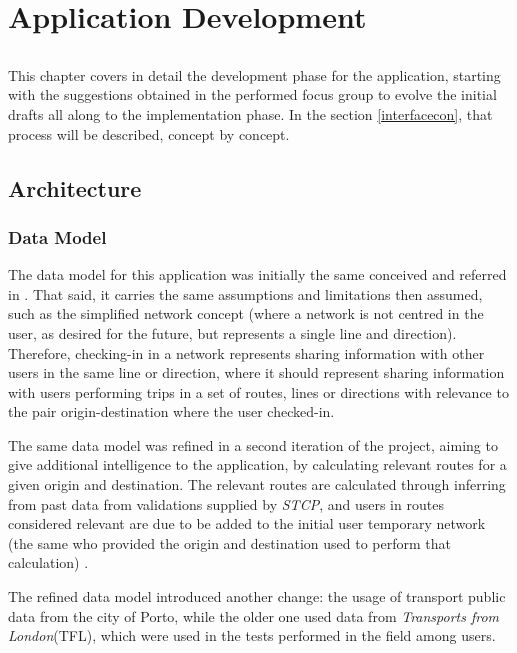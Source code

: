 \chapter{Application Development} \label{chap:chap5}

\section*{}

This chapter covers in detail the development phase for the application, starting with the suggestions obtained in the performed focus group to evolve the initial drafts all along to the implementation phase. In the section \ref{interfacecon}, that process will be described, concept by concept.

\section{Architecture}

\subsection{Data Model}

The data model for this application was initially the same conceived and referred in \cite{kn:Gonc12}. That said, it carries the same assumptions and limitations then assumed, such as the simplified network concept (where a network is not centred in the user, as desired for the future, but represents a single line and direction).
Therefore, checking-in in a network represents sharing information with other users in the same line or direction, where it should represent sharing information with users performing trips in a set of routes, lines or directions with relevance to the pair origin-destination where the user checked-in.

The same data model was refined in a second iteration of the project, aiming to give additional intelligence to the application, by calculating relevant routes for a given origin and destination. The relevant routes are calculated through inferring from past data from validations supplied by \emph{STCP}, and users in routes considered relevant are due to be added to the initial user temporary network (the same who provided the origin and destination used to perform that calculation) \cite{kn:Dia13}.

The refined data model introduced another change: the usage of transport public data from the city of Porto, while the older one used data from \emph{Transports from London}(TFL), which were used in the tests performed in the field among users. 

